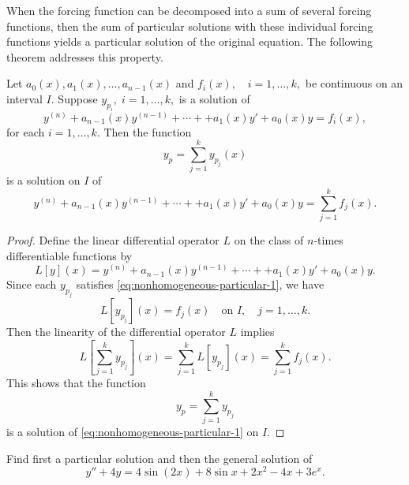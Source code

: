  
 	When the forcing function can be decomposed into a sum of several forcing functions, then the sum of  particular solutions with these individual forcing functions yields a particular solution of the original equation. The following theorem addresses this property.
 \begin{theorem}\label{thm:superposition-particular-solutions}
 Let $a_0(x), a_1(x), \dots, a_{n-1}(x) $  and $f_i(x), \quad i = 1, \dots, k,$ be continuous on an interval $I.$ Suppose $y_{p_i},\; i = 1, \dots, k,$ is a solution of
 \begin{equation}\label{eq:nonhomogeneous-particular-1}
 	y^{(n)}+ a_{n-1}(x)y^{(n-1)}+ \cdots+ + a_1(x) y' + a_0(x) y = f_i(x),
 \end{equation}
 for each $i = 1, \dots, k.$ 
  Then the function  \[y_p= \sum_{j=1}^ky_{p_j}(x) \] is a solution on $I$ of
  \begin{equation}\label{eq:nonhomogeneous-particular-3}
  		y^{(n)}+ a_{n-1}(x)y^{(n-1)}+ \cdots+ + a_1(x) y' + a_0(x) y = \sum_{j=1}^kf_j(x).
  \end{equation}
 \end{theorem}
 \begin{proof}
 	 Define the linear differential operator $L$ on the class of $n$-times differentiable functions by
 	\[L[y](x) = y^{(n)}+ a_{n-1}(x)y^{(n-1)}+ \cdots+ + a_1(x) y' + a_0(x) y.\]
 	Since each $y_{p_j}$ satisfies \eqref{eq:nonhomogeneous-particular-1},
 	we have
 	\[L[y_{p_j}](x)= f_j(x) \quad \mbox{on } I,\quad j  = 1, \dots, k.\] Then the linearity of the differential operator $L$ implies
 	\[L\left[\sum_{j=1}^ky_{p_j}\right](x) =\sum_{j=1}^kL[y_{p_j}](x)= \sum_{j=1}^kf_j(x).\] This shows that the function \[y_p= \sum_{j=1}^ky_{p_j}\] is a solution of \eqref{eq:nonhomogeneous-particular-1} on $I.$
 \end{proof}
 \begin{example}\label{eg:superposition-particular-solutions}
 Find first a particular solution and then the general solution of 
 \begin{equation}\label{eq:superposition-particular-solutions}
 	y''+4y = 4\sin(2x)+8 \sin x+ 2x^2 -4x+ 3 e^x.
 \end{equation} 
 \end{example}
